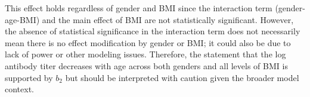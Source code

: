 \documentclass{article}
\begin{document}
This effect holds regardless of gender and BMI since the interaction term (gender-age-BMI) and the main effect of BMI are not statistically significant. However, the absence of statistical significance in the interaction term does not necessarily mean there is no effect modification by gender or BMI; it could also be due to lack of power or other modeling issues. Therefore, the statement that the log antibody titer decreases with age across both genders and all levels of BMI is supported by \(b_2\) but should be interpreted with caution given the broader model context.
\end{document}

